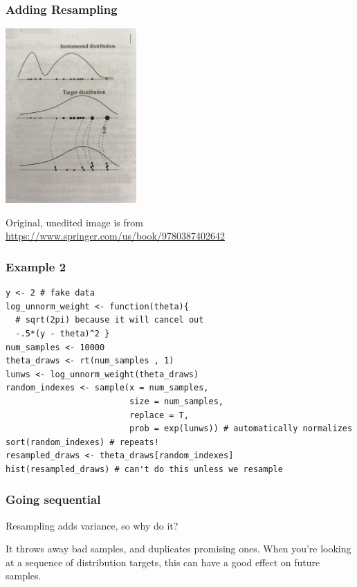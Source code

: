 \documentclass{beamer}
\begin{document}
\begin{frame}[fragile]
\frametitle{Adding Resampling}

\begin{center}
\includegraphics[width=50mm]{isr.jpg}
\end{center}
Original, unedited image is from \url{https://www.springer.com/us/book/9780387402642}

\end{frame}







\begin{frame}[fragile]
\frametitle{Example 2}

\begin{verbatim}
y <- 2 # fake data
log_unnorm_weight <- function(theta){ 
  # sqrt(2pi) because it will cancel out 
  -.5*(y - theta)^2 }
num_samples <- 10000
theta_draws <- rt(num_samples , 1)
lunws <- log_unnorm_weight(theta_draws)
random_indexes <- sample(x = num_samples, 
                         size = num_samples, 
                         replace = T, 
                         prob = exp(lunws)) # automatically normalizes
sort(random_indexes) # repeats!
resampled_draws <- theta_draws[random_indexes]
hist(resampled_draws) # can't do this unless we resample
\end{verbatim}

\end{frame}


\begin{frame}[fragile]
\frametitle{Going sequential}

Resampling adds variance, so why do it?
\newline

It throws away bad samples, and duplicates promising ones. When you're looking at a sequence of distribution targets, this can have a good effect on future samples.


\end{frame}
\end{document}
